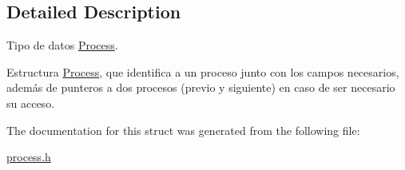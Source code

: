 \subsection{Detailed Description}
Tipo de datos \hyperlink{structProcess}{Process}. 

Estructura \hyperlink{structProcess}{Process}, que identifica a un proceso junto con los campos necesarios, además de punteros a dos procesos (previo y siguiente) en caso de ser necesario su acceso. 

The documentation for this struct was generated from the following file\-:\begin{DoxyCompactItemize}
\item 
\hyperlink{process_8h}{process.\-h}\end{DoxyCompactItemize}
